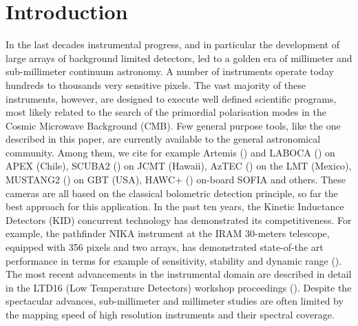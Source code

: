 \documentclass[]{aa} %
\begin{document}

   \maketitle
%

\section{Introduction}

In the last decades instrumental progress, and in particular the development of large arrays of background limited detectors, led to a golden era of millimeter and sub-millimeter continuum astronomy. A number of instruments operate today hundreds to thousands very sensitive pixels. The vast majority of these instruments, however, are designed to execute well defined scientific programs, most likely related to the search of the primordial polarisation modes in the Cosmic Microwave Background (CMB). Few general purpose tools, like the one described in this paper, are currently available to the general astronomical community. Among them, we cite for example Artemis (\cite{Reveret2014}) and LABOCA (\cite{Siringo2009}) on APEX (Chile), SCUBA2 (\cite{Holland2013}) on JCMT (Hawaii), AzTEC (\cite{Chavez-Dagostino2016}) on the LMT (Mexico), MUSTANG2 (\cite{Dicker2014}) on GBT (USA), HAWC+ (\cite{Staguhn2016}) on-board SOFIA and others. These cameras are all based on the classical bolometric detection principle, so far the best approach for this application. In the past ten years, the Kinetic Inductance Detectors (KID) concurrent technology has demonstrated its competitiveness. For example, the pathfinder NIKA instrument at the IRAM 30-meters telescope, equipped with 356 pixels and two arrays, has demonstrated state-of-the art performance in terms for example of sensitivity, stability and dynamic range (\cite{Catalano2014, Monfardini2011, Adam2014}). The most recent advancements in the instrumental domain are described in detail in the LTD16 (Low Temperature Detectors) workshop proceedings (\cite{ltd16:2016}). Despite the spectacular advances, sub-millimeter and millimeter studies are often limited by the mapping speed of high resolution instruments and their spectral coverage. 

\end{document}
